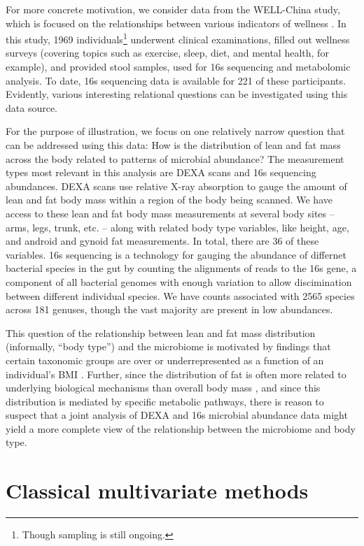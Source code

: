\documentclass[14pt]{extarticle}
\begin{document}
For more concrete motivation, we consider data from the WELL-China study, which
is focused on the relationships between various indicators of wellness
\citep{wellchina}. In this study, 1969 individuals\footnote{Though sampling is
  still ongoing.} underwent clinical examinations, filled out wellness surveys
(covering topics such as exercise, sleep, diet, and mental health, for example),
and provided stool samples, used for 16s sequencing and metabolomic analysis. To
date, 16s sequencing data is available for 221 of these participants. Evidently,
various interesting relational questions can be investigated using this data
source.

For the purpose of illustration, we focus on one relatively narrow question that
can be addressed using this data: How is the distribution of lean and fat mass
across the body related to patterns of microbial abundance? The measurement
types most relevant in this analysis are DEXA scans and 16s sequencing abundances.
DEXA scans use relative X-ray absorption to gauge the amount of lean and fat body
mass within a region of the body being scanned. We have access to these
lean and fat body mass measurements at several body sites -- arms, legs, trunk,
etc. -- along with related body type variables, like height, age, and android
and gynoid fat measurements. In total, there are 36 of these variables. 16s
sequencing is a technology for gauging the abundance of differnet bacterial
species in the gut by counting the alignments of reads to the 16s gene, a
component of all bacterial genomes with enough variation to allow discimination
between different individual species. We have counts associated with 2565
species across 181 genuses, though the vast majority are present in low
abundances.

This question of the relationship between lean and fat mass distribution
(informally, ``body type'') and the microbiome is motivated by findings that
certain taxonomic groups are over or underrepresented as a function of an
individual's BMI \citep{ley2006microbial, turnbaugh2009core, ley2005obesity,
  ley2010obesity}. Further, since the distribution of fat is often more related
to underlying biological mechanisms than overall body mass
\citep{matsuzawa2008role}, and since this distribution is mediated by specific
metabolic pathways, there is reason to suspect that a joint analysis of DEXA and
16s microbial abundance data might yield a more complete view of the
relationship between the microbiome and body type.

\section{Classical multivariate methods}
\end{document}
